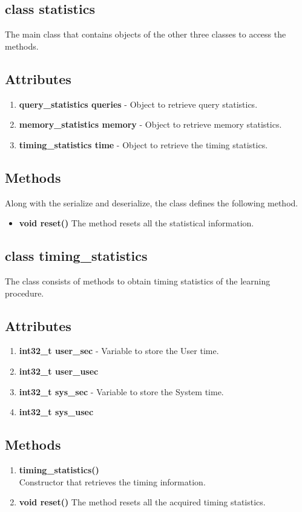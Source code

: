 \subsection{class statistics}
The main class that contains objects of the other three classes to access the methods. 
\subsection*{Attributes}
\begin{enumerate}
 \item \textbf{query\_statistics queries} - Object to retrieve query statistics.
 \item \textbf{memory\_statistics memory} - Object to retrieve memory statistics.
 \item \textbf{timing\_statistics time} - Object to retrieve the timing statistics.
\end{enumerate}
\subsection*{Methods}
Along with the serialize and deserialize, the class defines the following method.
\begin{itemize}
 \item \textbf{void reset()}
	The method resets all the statistical information.
\end{itemize}

\subsection{class timing\_statistics}
The class consists of methods to obtain timing statistics of the learning procedure.
\subsection*{Attributes}
\begin{enumerate}
 \item \textbf{int32\_t user\_sec} - Variable to store the User time.
 \item \textbf{int32\_t user\_usec}
 \item \textbf{int32\_t sys\_sec} - Variable to store the System time.
 \item \textbf{int32\_t sys\_usec}
\end{enumerate}
\subsection*{Methods}
\begin{enumerate}
 \item \textbf{timing\_statistics()} \\
	Constructor that retrieves the timing information.
 \item \textbf{void reset()}
	The method resets all the acquired timing statistics.
\end{enumerate}

